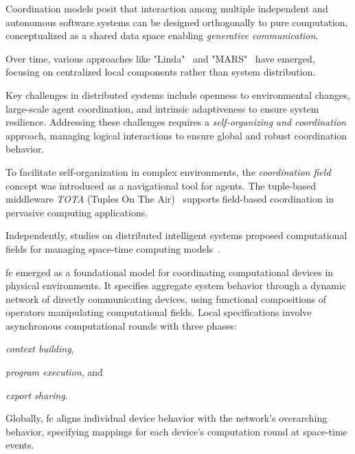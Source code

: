 \documentclass[12pt, a4paper]{article}
\newenvironment{inlinelist}{\begin{enumerate*}[label=\emph{(\roman*)}]}{\end{enumerate*}}
\begin{document}
Coordination models posit that interaction among multiple independent and autonomous software systems can be designed
orthogonally to pure computation, conceptualized as a shared data space enabling \emph{generative communication}.

Over time, various approaches like "Linda"~\cite{ViroliCoordination2012} and "MARS"~\cite{mars} have emerged,
focusing on centralized local components rather than system distribution.

Key challenges in distributed systems include openness to environmental changes, large-scale agent coordination,
and intrinsic adaptiveness to ensure system resilience.
%
Addressing these challenges requires a \emph{self-organizing and coordination} approach, managing logical interactions to
ensure global and robust coordination behavior.

To facilitate self-organization in complex environments, the \emph{coordination field} concept was introduced as a
navigational tool for agents.
%
The tuple-based middleware \textit{TOTA} (Tuples On The Air)~\cite{tota} supports field-based coordination in pervasive
computing applications.

Independently, studies on distributed intelligent systems proposed computational fields for managing space-time
computing models~\cite{JLAMP2019}.

\ac{fc} emerged as a foundational model for coordinating computational devices in physical environments.
%
It specifies aggregate system behavior through a dynamic network of directly communicating devices,
using functional compositions of operators manipulating computational fields.
%
Local specifications involve asynchronous computational rounds with three phases:
\begin{inlinelist}
    \item \emph{context building},
    \item \emph{program execution}, and
    \item \emph{export sharing}.
\end{inlinelist}

Globally,
\ac{fc} aligns individual device behavior with the network's overarching behavior,
specifying mappings for each device's computation round at space-time events.
\end{document}
